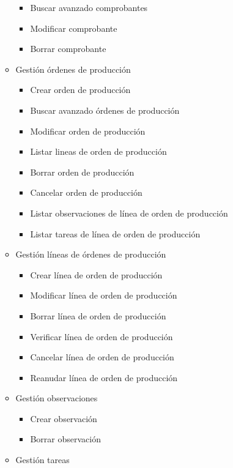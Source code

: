 \begin{itemize}
\begin{itemize}
\begin{itemize}
                \item Buscar avanzado comprobantes
                \item Modificar comprobante
                \item Borrar comprobante
            \end{itemize}
            \item Gestión órdenes de producción
            \begin{itemize}
                \item Crear orden de producción
                \item Buscar avanzado órdenes de producción
                \item Modificar orden de producción
                \item Listar lineas de orden de producción
                \item Borrar orden de producción
                \item Cancelar orden de producción
                \item Listar observaciones de línea de orden de producción
                \item Listar tareas de línea de orden de producción
            \end{itemize}
            \item Gestión líneas de órdenes de producción
            \begin{itemize}
                \item Crear línea de orden de producción
                \item Modificar línea de orden de producción
                \item Borrar línea de orden de producción
                \item Verificar línea de orden de producción
                \item Cancelar línea de orden de producción	
                \item Reanudar línea de orden de producción		
            \end{itemize}
            \item Gestión observaciones
            \begin{itemize}
                \item Crear observación
                \item Borrar observación
            \end{itemize}
            \item Gestión tareas

\end{itemize}
\end{itemize}
